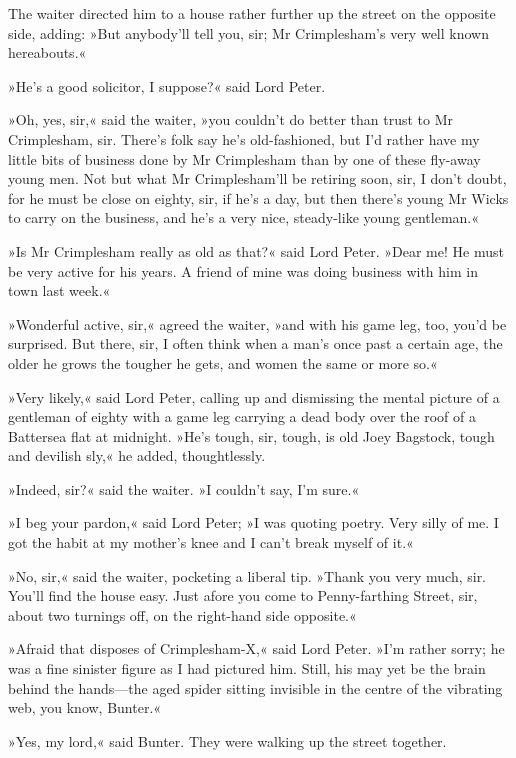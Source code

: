 The waiter directed him to a house rather further up the street on the opposite side, adding: »But anybody'll tell you, sir; Mr Crimplesham's very well known hereabouts.«

»He's a good solicitor, I suppose?« said Lord Peter.

»Oh, yes, sir,« said the waiter, »you couldn't do better than trust to Mr Crimplesham, sir. There's folk say he's old-fashioned, but I'd rather have my little bits of business done by Mr Crimplesham than by one of these fly-away young men. Not but what Mr Crimplesham'll be retiring soon, sir, I don't doubt, for he must be close on eighty, sir, if he's a day, but then there's young Mr Wicks to carry on the business, and he's a very nice, steady-like young gentleman.«

»Is Mr Crimplesham really as old as that?« said Lord Peter. »Dear me! He must be very active for his years. A friend of mine was doing business with him in town last week.«

»Wonderful active, sir,« agreed the waiter, »and with his game leg, too, you'd be surprised. But there, sir, I often think when a man's once past a certain age, the older he grows the tougher he gets, and women the same or more so.«

»Very likely,« said Lord Peter, calling up and dismissing the mental picture of a gentleman of eighty with a game leg carrying a dead body over the roof of a Battersea flat at midnight. »He's tough, sir, tough, is old Joey Bagstock, tough and devilish sly,« he added, thoughtlessly.

»Indeed, sir?« said the waiter. »I couldn't say, I'm sure.«

»I beg your pardon,« said Lord Peter; »I was quoting poetry. Very silly of me. I got the habit at my mother's knee and I can't break myself of it.«

»No, sir,« said the waiter, pocketing a liberal tip. »Thank you very much, sir. You'll find the house easy. Just afore you come to Penny-farthing Street, sir, about two turnings off, on the right-hand side opposite.«

»Afraid that disposes of Crimplesham-X,« said Lord Peter. »I'm rather sorry; he was a fine sinister figure as I had pictured him. Still, his may yet be the brain behind the hands\allowbreak---\allowbreak the aged spider sitting invisible in the centre of the vibrating web, you know, Bunter.«

»Yes, my lord,« said Bunter. They were walking up the street together.

